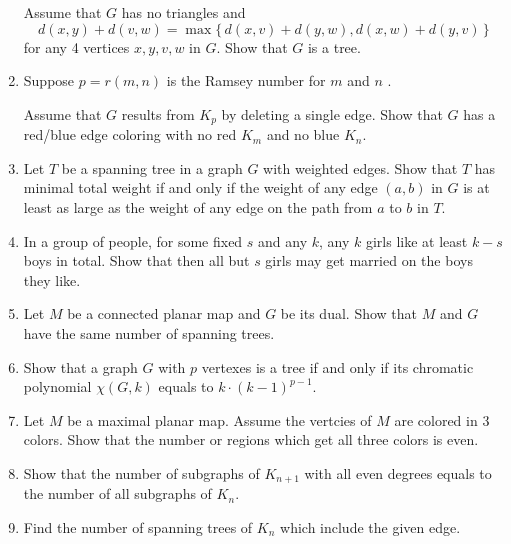 \begin{enumerate}
Assume that $G$ has no triangles and
\[d(x,y)+d(v,w)=\max\{\,d(x,v)+d(y,w),d(x,w)+d(y,v)\,\}\]
for any 4 vertices $x,y,v,w$ in $G$.
Show that $G$ is a tree.
\item Suppose $p=r(m,n)$ is the Ramsey number for $m$ and $n$%
.

Assume that $G$ results from $K_p$ by deleting a single edge.
Show that $G$ has a red/blue edge coloring with no red
$K_m$ and no blue $K_n$.
\item Let $T$ be a spanning tree in a graph $G$ with weighted edges.
Show that $T$ has minimal total weight if and only if the weight of any edge $(a,b)$ in $G$ is at least as large as the weight of any edge on the path from $a$ to $b$ in $T$.
\item In a group of people, for some fixed $s$ and any $k$,
any $k$ girls like at least $k-s$ boys in total.
Show that then all but $s$ girls may get married on the boys they like.
\item Let $M$ be a connected planar map and $G$ be its dual.
Show that $M$ and $G$ have the same number of spanning trees.
\item  Show that a graph $G$ with $p$ vertexes is a tree if and only if
its chromatic polynomial $\chi(G,k)$ equals to $k\cdot(k-1)^{p-1}$.
\item Let $M$ be a maximal planar map.
Assume the vertcies of $M$ are colored in 3 colors.
Show that the number or regions which get all three colors is even.
\item Show that the number of subgraphs of $K_{n+1}$ with all even degrees equals to the number of all subgraphs of $K_n$.

\item Find the number of spanning trees of $K_n$ which include the given edge.

\end{enumerate}

